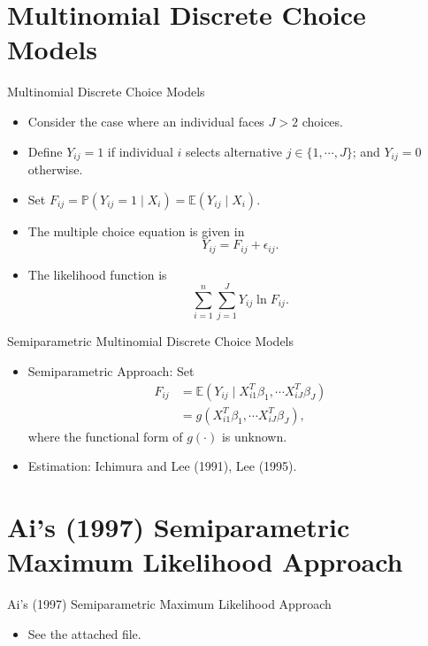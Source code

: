 \documentclass[xcolor=svgnames,dvipdfmx,cjk]{beamer}
\theoremstyle{example}
\def\E{\mathbb{E}}
\def\P{\mathbb{P}}
\begin{document}
\section{Multinomial Discrete Choice Models}
  
\begin{frame}{Multinomial Discrete Choice Models}
\begin{itemize}
  \item Consider the case where an individual faces $J > 2$ choices.
  \item Define $Y_{ij} = 1$ if individual $i$ selects 
        alternative $j \in \{1, \cdots, J\}$; 
        and $Y_{ij}=0$ otherwise.
  \item Set $F_{ij} = \P(Y_{ij}=1 \mid X_i) =\E(Y_{ij} \mid X_i)$.
  \item The multiple choice equation is given in 
        \[Y_{ij} = F_{ij} + \epsilon_{ij}.\]
  \item The likelihood function is 
        \[\sum_{i=1}^n\sum_{j=1}^J Y_{ij} \ln F_{ij}.\]
\end{itemize}
\end{frame} 


\begin{frame}{Semiparametric Multinomial Discrete Choice Models}
\begin{itemize}
    \item \alert{Semiparametric Approach}: Set
          \begin{align*}
            F_{ij} &= \E(Y_{ij} \mid X_{i1}^T\beta_1, \cdots X_{iJ}^T\beta_J) \\
                   &= g(X_{i1}^T\beta_1, \cdots X_{iJ}^T\beta_J),
          \end{align*}
          where the functional form of $g(\cdot)$ is unknown.
    \item \alert{Estimation}:
          Ichimura and Lee (1991), Lee (1995).
\end{itemize}
\end{frame} 

\section{Ai's (1997) Semiparametric Maximum Likelihood Approach}
  
\begin{frame}{Ai's (1997) Semiparametric Maximum Likelihood Approach}
\begin{itemize}
  \item See the attached file.
\end{itemize}
\end{frame}  
  
\end{document}
